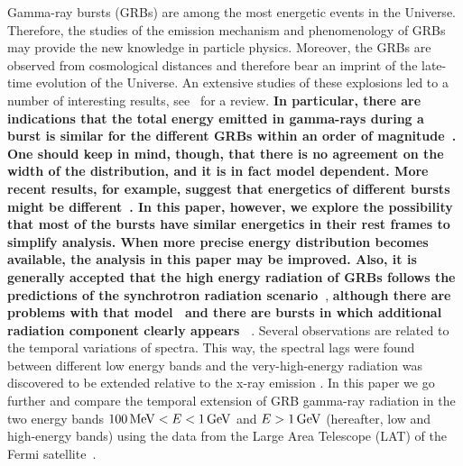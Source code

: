 \documentclass[manuscript]{aastex}
\begin{document}
Gamma-ray bursts (GRBs) are among the most energetic events in the
Universe. Therefore, the studies of the emission mechanism and
phenomenology of GRBs may provide the new knowledge in particle
physics. Moreover, the GRBs are observed from cosmological distances
and therefore bear an imprint of the late-time evolution of the
Universe. An extensive studies of these explosions led to a number of
interesting results, see~\citet{Vianello:2013ela,Gehrels:2013xd} for a
review. {\bf In particular, there are indications that the total energy emitted in gamma-rays during a
burst is similar for the different GRBs within an order
of magnitude~\citep{postnov1999grb,Bloom:2003wy}.
One should keep in mind, though, that there is no agreement on the width of the distribution, and it is in fact model dependent. More recent results, for example, suggest that energetics of different bursts might be different~\citep{racusin2009jet, chandra2012radio}. In this paper, however, we explore the possibility that most of the
bursts have similar energetics in their rest frames to simplify analysis. When more precise energy distribution becomes available, the analysis in this paper may be improved. {\bf Also, it is generally accepted that} the
high energy radiation of GRBs follow{\bf s} the predictions of
the synchrotron radiation scenario~\citep{Wang:2013ptaw}}, {\bf although there are problems with that model~\citep{Daigne:2010fb} and there are bursts in which additional radiation component clearly appears~\citep{Abdo:2009pg} }. Several
observations are related to the temporal variations of spectra. This
way, the spectral lags were found between different low energy bands {\bf \citep{cheng1995time,Wu:1999ms} }and the very-high-energy radiation was discovered to
be extended relative to the x-ray emission
\citep{Castignani:2014gaa,Lange:2013uh,Vianello:2013ela}. In this paper
we go further and compare the temporal extension of GRB gamma-ray
radiation in the two energy bands $\unit[100]{MeV} < E <
\unit[1]{GeV}$ and $E > \unit[1]{GeV}$ (hereafter, low and high-energy
bands) using the data from the Large Area Telescope (LAT) of the Fermi
satellite~\citep{2009ApJ...697.1071A,Ackermann:2012kna}. 
\end{document}
